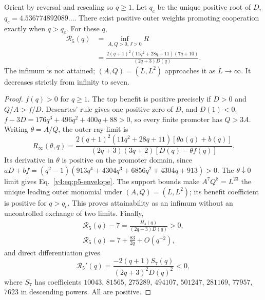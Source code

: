 \documentclass[10pt,a4paper]{amsart}
\begin{document}
\begin{proposition}\label{v4:prop:p5-envelope}\label{app:v4-p5-envelope}
Orient by reversal and rescaling so $q\ge1$. Let $q_c$ be the unique
positive root of $D$, $q_c=4.536774892089\ldots$. There exist positive
outer weights promoting cooperation exactly when $q>q_c$. For these $q$,
\begin{equation}\label{v4:eq:p5-envelope}
 \begin{aligned}
 \mathcal R_5(q)&=\inf_{A,Q>0,J>0}R\\
 &=\frac{2(q+1)^2(11q^2+28q+11)(7q+10)}{(2q+3)D(q)}.
 \end{aligned}
\end{equation}
The infimum is not attained; $(A,Q)=(L,L^2)$ approaches it as $L\to\infty$.
It decreases strictly from infinity to seven.
\end{proposition}

\begin{proof}
$f(q)>0$ for $q\ge1$. The top benefit is positive precisely if
$D>0$ and $Q/A>f/D$. Descartes' rule gives one positive zero of $D$,
and $D(1)<0$. 
$f-3D=176q^3+496q^2+400q+88>0$, so every finite promoter has $Q>3A$.
Writing $\theta=A/Q$, the outer-ray limit is
\begin{equation}
 R_\infty(\theta,q)=
 \frac{2(q+1)^2(11q^2+28q+11)[\theta a(q)+b(q)]}
 {(2q+3)(3q+2)[D(q)-\theta f(q)]}.
\end{equation}
Its derivative in $\theta$ is positive on the promoter domain, since
$aD+bf=(q^2-1)(913q^4+4304q^3+6856q^2+4304q+913)>0$.
The $\theta\downarrow0$ limit gives Eq.~\eqref{v4:eq:p5-envelope}.
The support bounds make $A^7Q^8=L^{23}$ the unique leading outer monomial
under $(A,Q)=(L,L^2)$; its benefit coefficient is positive for $q>q_c$.
This proves attainability as an infimum without an uncontrolled exchange
of two limits. Finally,
\begin{equation}
 \begin{gathered}
 \mathcal R_5(q)-7=\frac{H_4(q)}{(2q+3)D(q)}>0,
 \\
 \mathcal R_5(q)=7+\frac{83}{2q}+O(q^{-2}),
 \end{gathered}
\end{equation}
and direct differentiation gives
\begin{equation}
 \mathcal R_5'(q)=\frac{-2(q+1)S_7(q)}{(2q+3)^2D(q)^2}<0,
\end{equation}
where $S_7$ has coefficients $10043$, $81565$, $275289$, $494107$,
$501247$, $281169$, $77957$, $7623$ in descending powers.
All are positive.
\end{proof}
\end{document}
